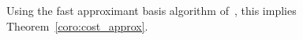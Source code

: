 \documentclass[final,1p,times,authoryear]{elsarticle}
\newcommand{\storeArg}{} %
\newcommand{\NN}{\mathbb{N}} %
\newcommand{\field}{\mathbb{K}} %
\newcommand{\matSpace}[1][\rdim]{\renewcommand\storeArg{#1}\matSpaceAux} %
\newcommand{\matSpaceAux}[1][\storeArg]{\field^{\storeArg \times #1}} %
\newcommand{\mat}[1]{\bm{\MakeUppercase{#1}}} %
\newcommand{\rdim}{m} %
\newcommand{\cdim}{{m'}} %
\newcommand{\seqelt}[1]{\bm{F}_{#1}} %
\newcommand{\seqeltSpace}{\matSpace[\rdim][\cdim]} %
\newcommand{\seq}{\mat{\mathcal{F}}} %
\newcommand{\seqL}{\mat{\mathcal{L}}} %
\newcommand{\degBd}{d} %
\newcommand{\degBdr}{d_{r}} %
\newcommand{\degBdl}{d_{\ell}} %
\newcommand{\trsp}[1]{#1^{\mathsf{T}}} %
\def\M {\ensuremath{\mathsf{M}}}
\def\K{\mathbb{K}}
\def\K {\ensuremath{\mathbb{K}}}
\newcommand{\mUt}{\trsp{\mU}}
\begin{document}


Using the fast approximant basis algorithm of~\citep{GiJeVi03}, this
implies Theorem~\ref{coro:cost_approx}.


\end{document}
